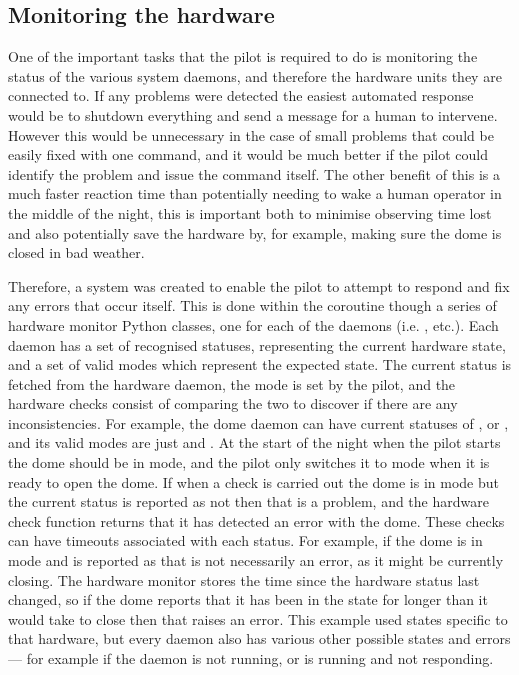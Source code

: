 \subsection{Monitoring the hardware}
\label{sec:monitors}
\begin{colsection}

One of the important tasks that the pilot is required to do is monitoring the status of the various system daemons, and therefore the hardware units they are connected to. If any problems were detected the easiest automated response would be to shutdown everything and send a message for a human to intervene. However this would be unnecessary in the case of small problems that could be easily fixed with one command, and it would be much better if the pilot could identify the problem and issue the command itself. The other benefit of this is a much faster reaction time than potentially needing to wake a human operator in the middle of the night, this is important both to minimise observing time lost and also potentially save the hardware by, for example, making sure the dome is closed in bad weather.

Therefore, a system was created to enable the pilot to attempt to respond and fix any errors that occur itself. This is done within the  coroutine though a series of hardware monitor Python classes, one for each of the daemons (i.e. ,  etc.). Each daemon has a set of recognised statuses, representing the current hardware state, and a set of valid modes which represent the expected state. The current status is fetched from the hardware daemon, the mode is set by the pilot, and the hardware checks consist of comparing the two to discover if there are any inconsistencies. For example, the dome daemon can have current statuses of ,  or , and its valid modes are just  and . At the start of the night when the pilot starts the dome should be in  mode, and the pilot only switches it to  mode when it is ready to open the dome. If when a check is carried out the dome is in  mode but the current status is reported as not  then that is a problem, and the hardware check function returns that it has detected an error with the dome. These checks can have timeouts associated with each status. For example, if the dome is in  mode and is reported as  that is not necessarily an error, as it might be currently closing. The hardware monitor stores the time since the hardware status last changed, so if the dome reports that it has been in the  state for longer than it would take to close then that raises an error. This example used states specific to that hardware, but every daemon also has various other possible states and errors --- for example if the daemon is not running, or is running and not responding.


\end{colsection}
